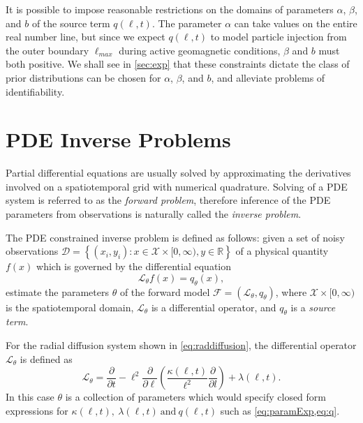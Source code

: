 It is possible to impose reasonable restrictions on the domains of parameters $\alpha$, $\beta$, 
and $b$ of the source term $q(\ell, t)$. The parameter $\alpha$ can take values on the entire 
real number line, but since we expect $q(\ell, t)$ to model particle injection from the outer 
boundary $\ell_{max}$ during active geomagnetic conditions, $\beta$ and $b$ must both positive. We 
shall see in \cref{sec:exp} that these constraints dictate the class of prior 
distributions can be chosen for $\alpha$, $\beta$, and $b$, and alleviate problems of 
identifiability.

\section{PDE Inverse Problems}\label{sec:inv}

Partial differential equations are usually solved by approximating the derivatives involved on a 
spatiotemporal grid with numerical quadrature. Solving of a PDE system is referred to as the 
\emph{forward problem}, therefore inference of the PDE parameters from observations is naturally 
called the \emph{inverse problem}.

The PDE constrained inverse problem is defined as follows: given a set of noisy observations 
$\mathcal{D} = \left\{ (x_i, y_i): x \in \mathcal{X} \times [0, \infty), y \in \mathbb{R} \right\}$ 
of a physical quantity $f(x)$ which is governed by the differential equation 
\begin{equation}\label{eq:forwardModel}
  \mathcal{L}_{\theta} f(x) = q_{\theta}(x),
\end{equation} 
estimate the parameters $\theta$ of the forward model 
$\mathcal{F} = \left( \mathcal{L}_{\theta}, q_{\theta} \right)$, where 
$\mathcal{X} \times [0, \infty)$ is the spatiotemporal domain, $\mathcal{L}_{\theta}$ is a 
differential operator, and $q_{\theta}$ is a \emph{source term}. 

For the radial diffusion system shown in \cref{eq:raddiffusion}, the differential operator 
$\mathcal{L}_{\theta}$ is defined as   
%
\[
  \mathcal{L}_{\theta} =
    \frac{\partial}{\partial{t}} - 
    \ell^2 \frac{\partial}{\partial{\ell}}\left( 
      \frac{\kappa(\ell, t)}{\ell^{2}} \frac{\partial}{\partial{l}} 
    \right) + 
    \lambda(\ell,t).  
\] 
%
In this case $\theta$ is a collection of parameters which would specify closed form expressions 
for $\kappa(\ell, t), \ \lambda(\ell, t) \ \text{and} \ q(\ell, t)$ such as \cref{eq:paramExp,eq:q}.


